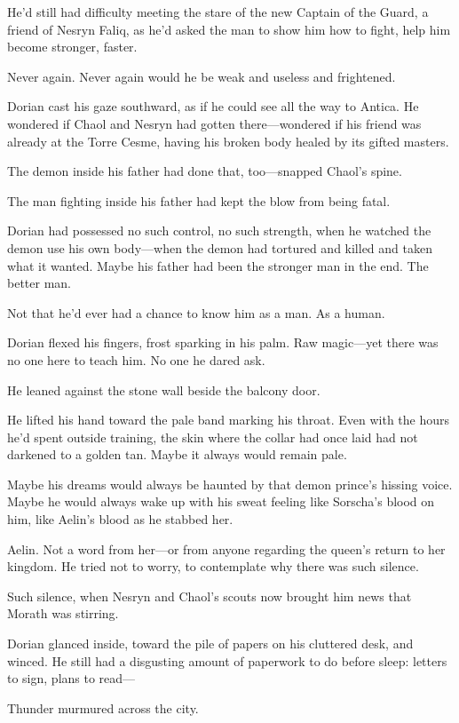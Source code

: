 He'd still had difficulty meeting the stare of the new Captain of the Guard, a friend of Nesryn Faliq, as he'd asked the man to show him how to fight, help him become stronger, faster.

Never again. Never again would he be weak and useless and frightened.

Dorian cast his gaze southward, as if he could see all the way to Antica. He wondered if Chaol and Nesryn had gotten there---wondered if his friend was already at the Torre Cesme, having his broken body healed by its gifted masters.

The demon inside his father had done that, too---snapped Chaol's spine.

The man fighting inside his father had kept the blow from being fatal.

Dorian had possessed no such control, no such strength, when he watched the demon use his own body---when the demon had tortured and killed and taken what it wanted. Maybe his father had been the stronger man in the end. The better man.

Not that he'd ever had a chance to know him as a man. As a human.

Dorian flexed his fingers, frost sparking in his palm. Raw magic---yet there was no one here to teach him. No one he dared ask.

He leaned against the stone wall beside the balcony door.

He lifted his hand toward the pale band marking his throat. Even with the hours he'd spent outside training, the skin where the collar had once laid had not darkened to a golden tan. Maybe it always would remain pale.

Maybe his dreams would always be haunted by that demon prince's hissing voice. Maybe he would always wake up with his sweat feeling like Sorscha's blood on him, like Aelin's blood as he stabbed her.

Aelin. Not a word from her---or from anyone regarding the queen's return to her kingdom. He tried not to worry, to contemplate why there was such silence.

Such silence, when Nesryn and Chaol's scouts now brought him news that Morath was stirring.

Dorian glanced inside, toward the pile of papers on his cluttered desk, and winced. He still had a disgusting amount of paperwork to do before sleep: letters to sign, plans to read---

Thunder murmured across the city.

